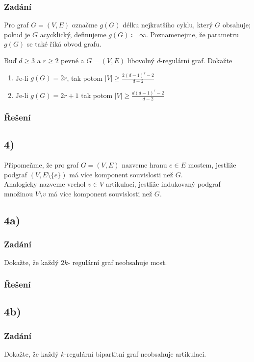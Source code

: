 \documentclass[../main.tex]{subfiles}
\begin{document}
\subsubsection*{Zadání}
Pro graf $G=(V,E)$ označme $g(G)$ délku nejkratšího cyklu, který $G$ obsahuje; pokud je $G$ acycklický, definujeme $g(G)\coloneq \infty$.
Poznamenejme, že parametru $g(G)$ se také říká obvod grafu.

Buď $d\geq 3$ a $r\geq 2$ pevné a $G=(V,E)$ libovolný $d$-regulární graf. Dokažte
\begin{enumerate}
    \item Je-li $g(G)=2r$, tak  potom $|V| \geq \frac{2(d-1)^r -2}{d-2}$
    \item Je-li $g(G) = 2r + 1$ tak potom $|V|\geq \frac{d(d-1)^r -2}{d-2}$
\end{enumerate}

\subsubsection*{Řešení}


\subsection{4)}
Připomeňme, že pro graf $G=(V,E)$ nazveme hranu $e\in E$ mostem, jestliže podgraf $(V,E\setminus\{e\})$ má více komponent souvislosti než $G$.\\
Analogicky nazveme vrchol $v\in V$ artikulací, jestliže indukovaný podgraf množinou $V\setminus{v}$ má více komponent souvislosti než $G$.

\subsection{4a)}
\subsubsection*{Zadání}
Dokažte, že každý $2k$- regulární graf neobsahuje most.



\subsubsection*{Řešení}


\subsection{4b)}
\subsubsection*{Zadání}
Dokažte, že každý $k$-regulární bipartitní graf neobsahuje artikulaci.
\end{document}
